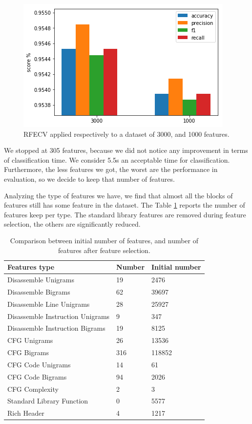 \begin{figure}[]
	\centering
	\includegraphics[width=0.6\columnwidth]{rfecv-confronto.png}
	\caption{RFECV applied respectively to a dataset of 3000, and 1000 features.}
	\label{fig:rfecv-comparison}
\end{figure}

We stopped at 305 features, because we did not notice any improvement in terms of classification time. We consider 5.5s an acceptable time for classification. Furthermore, the less features we got, the worst are the performance in evaluation, so we decide to keep that number of features.

Analyzing the type of features we have, we find that almost all the blocks of features still has some feature in the dataset. The Table \ref{tab:num-feat-842} reports the number of features keep per type. The standard library features are removed during feature selection, the others are significantly reduced.  

\begin{table}[]
	\caption{Comparison between initial number of features, and number of features after feature selection.}
	\label{tab:num-feat-842}
	\begin{tabular}{lll}
		\toprule
		Features type                    & Number & Initial number\\
		\midrule
		Disassemble Unigrams   &19 & 2476           \\
		Disassemble Bigrams    &62   & 39697          \\
		Disassemble Line Unigrams  &28& 25927          \\
		Disassemble Instruction Unigrams & 9 & 347   \\
		Disassemble Instruction Bigrams  & 19 & 8125    \\
		CFG Unigrams    &26 & 13536   \\
		CFG Bigrams      &316 & 118852  \\
		CFG Code Unigrams  & 14 & 61     \\
		CFG Code Bigrams   & 94 & 2026  \\
		CFG Complexity          & 2 & 3     \\
		Standard Library Function & 0 & 5577  \\
		Rich Header   & 4 & 1217  \\
		\bottomrule	
	\end{tabular}
\end{table}


